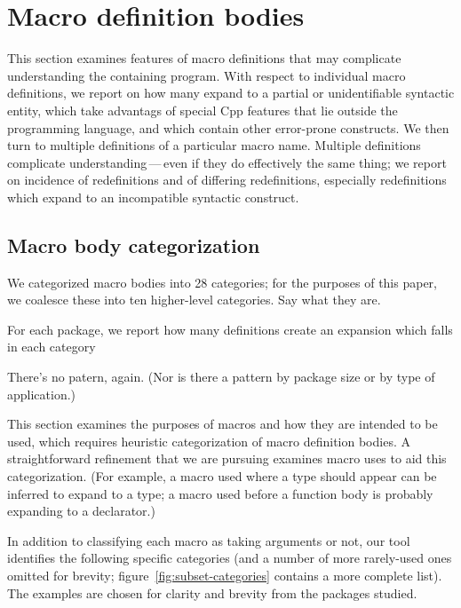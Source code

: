 \documentclass[10pt]{article}
\begin{document}
\section{Macro definition bodies}

This section examines features of macro definitions that may complicate
understanding the containing program.  With respect to individual macro
definitions, we report on how many expand to a partial or unidentifiable
syntactic entity, which take advantags of special Cpp features that lie
outside the programming language, and which contain other error-prone
constructs.  We then turn to multiple definitions of a particular macro
name.  Multiple definitions complicate understanding\,---\,even if they do
effectively the same thing; we report on incidence of redefinitions and of
differing redefinitions, especially redefinitions which expand to an
incompatible syntactic construct.  

\subsection{Macro body categorization}

We categorized macro bodies into 28 categories; for the purposes of
  this paper, we coalesce these into ten higher-level categories.
  Say what they are.

For each package, we report how many definitions create an
  expansion which falls in each category

There's no patern, again.  (Nor is there a pattern by package size
  or by type of application.)

\label{sec:categorization}

This section examines the purposes of macros and how they are intended to
be used, which requires heuristic categorization of macro definition bodies.  A
straightforward refinement that we are pursuing examines macro uses to aid
this categorization.  (For example, a macro used where a type should appear
can be inferred to expand to a type; a macro used before a function body is
probably expanding to a declarator.)

In addition to classifying each macro as taking arguments or not, our tool
identifies the following specific categories (and a number of more
rarely-used ones omitted for brevity;
figure~\ref{fig:subset-categories} contains a more complete list).  The examples
are chosen for clarity and brevity from the packages studied.

{}
\end{document}
